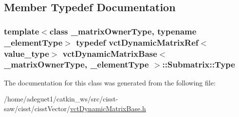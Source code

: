 \subsection{Member Typedef Documentation}
\hypertarget{classvct_dynamic_matrix_base_1_1_submatrix_a253f9d0900cce7df1b7ec9e3d5117623}{
\subsubsection[{Type}]{\setlength{\rightskip}{0pt plus 5cm}template$<$class \-\_\-matrix\-Owner\-Type, typename \-\_\-element\-Type$>$ typedef {\bf vct\-Dynamic\-Matrix\-Ref}$<$value\-\_\-type$>$ {\bf vct\-Dynamic\-Matrix\-Base}$<$ \-\_\-matrix\-Owner\-Type, \-\_\-element\-Type $>$\-::{\bf Submatrix\-::\-Type}}}\label{classvct_dynamic_matrix_base_1_1_submatrix_a253f9d0900cce7df1b7ec9e3d5117623}


The documentation for this class was generated from the following file\-:\begin{DoxyCompactItemize}
\item 
/home/adeguet1/catkin\-\_\-ws/src/cisst-\/saw/cisst/cisst\-Vector/\hyperlink{vct_dynamic_matrix_base_8h}{vct\-Dynamic\-Matrix\-Base.\-h}\end{DoxyCompactItemize}

